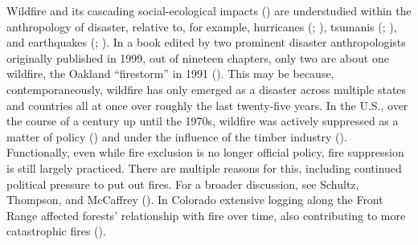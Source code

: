 \documentclass[
]{article}
\begin{document}
Wildfire and its cascading social-ecological impacts () are understudied within the anthropology of disaster, relative to, for example, hurricanes (; ), tsumanis (; ), and earthquakes (; ). In a book edited by two prominent disaster anthropologists originally published in 1999, out of nineteen chapters, only two are about one wildfire, the Oakland ``firestorm'' in 1991 (). This may be because, contemporaneously, wildfire has only emerged as a disaster across multiple states and countries all at once over roughly the last twenty-five years. In the U.S., over the course of a century up until the 1970s, wildfire was actively suppressed as a matter of policy () and under the influence of the timber industry (). Functionally, even while fire exclusion is no longer official policy, fire suppression is still largely practiced. There are multiple reasons for this, including continued political pressure to put out fires. For a broader discussion, see Schultz, Thompson, and McCaffrey (). In Colorado extensive logging along the Front Range affected forests' relationship with fire over time, also contributing to more catastrophic fires ().
\end{document}
